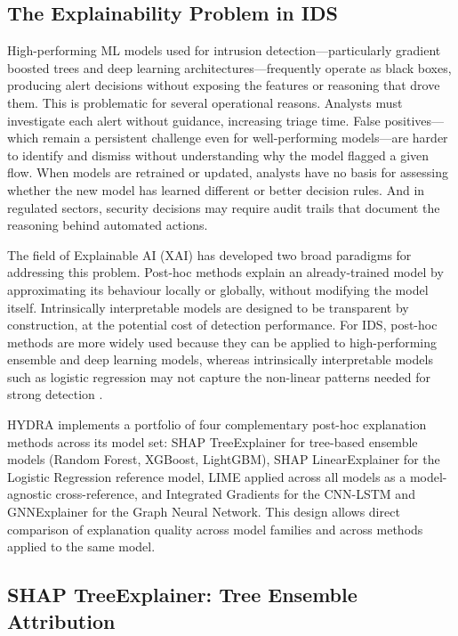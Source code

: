 \documentclass[12pt,a4paper]{report}
\begin{document}
\subsection{The Explainability Problem in IDS}
\label{sec:xai-problem}

High-performing ML models used for intrusion detection---particularly gradient boosted trees and deep learning architectures---frequently operate as black boxes, producing alert decisions without exposing the features or reasoning that drove them. This is problematic for several operational reasons. Analysts must investigate each alert without guidance, increasing triage time. False positives---which remain a persistent challenge even for well-performing models---are harder to identify and dismiss without understanding why the model flagged a given flow. When models are retrained or updated, analysts have no basis for assessing whether the new model has learned different or better decision rules. And in regulated sectors, security decisions may require audit trails that document the reasoning behind automated actions.

The field of Explainable AI (XAI) has developed two broad paradigms for addressing this problem. Post-hoc methods explain an already-trained model by approximating its behaviour locally or globally, without modifying the model itself. Intrinsically interpretable models are designed to be transparent by construction, at the potential cost of detection performance. For IDS, post-hoc methods are more widely used because they can be applied to high-performing ensemble and deep learning models, whereas intrinsically interpretable models such as logistic regression may not capture the non-linear patterns needed for strong detection \citep{adadi2018}.

HYDRA implements a portfolio of four complementary post-hoc explanation methods across its model set: SHAP TreeExplainer for tree-based ensemble models (Random Forest, XGBoost, LightGBM), SHAP LinearExplainer for the Logistic Regression reference model, LIME applied across all models as a model-agnostic cross-reference, and Integrated Gradients for the CNN-LSTM and GNNExplainer for the Graph Neural Network. This design allows direct comparison of explanation quality across model families and across methods applied to the same model.

\subsection{SHAP TreeExplainer: Tree Ensemble Attribution}
\label{sec:shap-tree}
\end{document}
